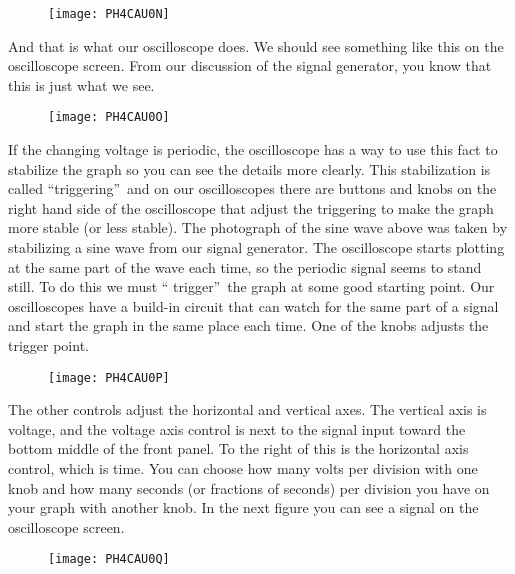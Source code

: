 \begin{figure}[h!]
	\centering
    \texttt{[image: PH4CAU0N]}
\end{figure}

And that is what our oscilloscope
does. We should see something like this on the oscilloscope screen. From our
discussion of the signal generator, you know that this is just what we see.%

\begin{figure}[h!]
	\centering
    \texttt{[image: PH4CAU0O]}
\end{figure}

If the changing voltage is periodic, the oscilloscope has a way to use this
fact to stabilize the graph so you can see the details more clearly. This
stabilization is called \textquotedblleft triggering\textquotedblright\ and
on our oscilloscopes there are buttons and knobs on the right hand side of
the oscilloscope that adjust the triggering to make the graph more stable
(or less stable). The photograph of the sine wave above was taken by
stabilizing a sine wave from our signal generator. The oscilloscope starts
plotting at the same part of the wave each time, so the periodic signal
seems to stand still. To do this we must \textquotedblleft
trigger\textquotedblright\ the graph at some good starting point. Our
oscilloscopes have a build-in circuit that can watch for the same part of a
signal and start the graph in the same place each time. One of the knobs
adjusts the trigger point. 

\begin{figure}[h!]
	\centering
    \texttt{[image: PH4CAU0P]}
\end{figure}

The other controls adjust the
horizontal and vertical axes. The vertical axis is voltage, and the voltage
axis control is next to the signal input toward the bottom middle of the
front panel. To the right of this is the horizontal axis control, which is
time. You can choose how many volts per division with one knob and how many
seconds (or fractions of seconds) per division you have on your graph with
another knob. In the next figure you can see a signal on the oscilloscope
screen. 

\begin{figure}[h!]
	\centering
	\texttt{[image: PH4CAU0Q]}
\end{figure}

